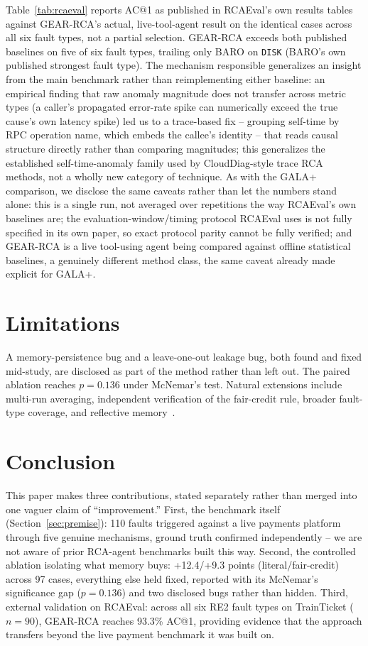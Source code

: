 \documentclass[conference]{IEEEtran}
\begin{document}
Table~\ref{tab:rcaeval} reports AC@1 as published in RCAEval's own results tables~\cite{rcaeval} against
GEAR-RCA's actual, live-tool-agent result on the identical cases across all six fault types, not a partial
selection. GEAR-RCA exceeds both published baselines on five of six fault types, trailing only BARO on
\texttt{DISK} (BARO's own published strongest fault type). The mechanism responsible generalizes an insight
from the main benchmark rather than reimplementing either baseline: an empirical finding that raw anomaly
magnitude does not transfer across metric types (a caller's
propagated error-rate spike can numerically exceed the true cause's own latency spike) led us to a trace-based
fix -- grouping self-time by RPC operation name, which embeds the callee's identity -- that reads causal
structure directly rather than comparing magnitudes; this generalizes the established self-time-anomaly family
used by CloudDiag-style trace RCA methods, not a wholly new category of technique. As with the GALA+
comparison, we disclose the same caveats rather than let the numbers stand alone: this is a single run, not
averaged over repetitions the way RCAEval's own baselines are; the evaluation-window/timing protocol RCAEval
uses is not fully specified in its own paper, so exact protocol parity cannot be fully verified; and GEAR-RCA is
a live tool-using agent being compared against offline statistical baselines, a genuinely different method
class, the same caveat already made explicit for GALA+.

\section{Limitations}
\label{sec:limitations}

A memory-persistence bug and a leave-one-out leakage bug, both found and fixed mid-study, are disclosed as part
of the method rather than left out. The paired ablation reaches $p=0.136$ under McNemar's test. Natural
extensions include multi-run averaging, independent verification of the fair-credit rule, broader fault-type
coverage, and reflective memory~\cite{rmm}.

\section{Conclusion}

This paper makes three contributions, stated separately rather than merged into one vaguer claim of
``improvement.'' First, the benchmark itself (Section~\ref{sec:premise}): 110 faults triggered against a live
payments platform through five genuine mechanisms, ground truth confirmed independently -- we are not aware of
prior RCA-agent benchmarks built this way. Second, the controlled ablation isolating what memory buys: +12.4/+9.3
points (literal/fair-credit) across 97 cases, everything else held fixed, reported with its McNemar's
significance gap ($p=0.136$) and two disclosed bugs rather than hidden. Third, external validation on RCAEval:
across all six RE2 fault types on TrainTicket ($n=90$), GEAR-RCA reaches 93.3\% AC@1, providing evidence that
the approach transfers beyond the live payment benchmark it was built on.
\end{document}
